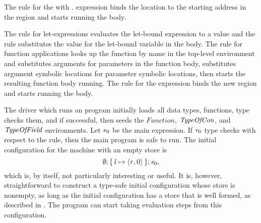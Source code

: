 The \textsc{\dletlocstart{}} rule for the  with .
expression binds the location to the starting address in the region
and starts running the body.

The \textsc{\dletexp{}} rule for let-expressions evaluates the let-bound
expression to a value and the \textsc{\dletval{}} rule substitutes the value for
the let-bound variable in the body.
%
The \textsc{\dapp{}} rule for function applications looks up the function by name
in the top-level environment and substitutes arguments for parameters
in the function body, substitutes argument symbolic locations for
parameter symbolic locations, then starts the resulting function body
running.
%
The \textsc{\dletregion{}} rule for the  expression binds the
new region and starts running the body.
%

The driver which runs an \ourcalc{} program initially loads all data
types, functions, type checks them, and if successful, then seeds the
$Function$, $\mathit{TypeOfCon}$, and $\mathit{TypeOfField}$ environments.
%
Let $\mathit{e}_0$ be the main expression.
%
If $\mathit{e}_0$ type checks with respect to the \textsc{\tprogram{}} rule, then
the main program is safe to run.
%
The initial configuration for the machine with an empty store is
\begin{displaymath}
\emptyset; \{ \, \mathit{l} \mapsto \langle \mathit{r}, 0 \rangle ^{} \,\}; \mathit{e}_0,
\end{displaymath}
which is, by itself, not particularly interesting or useful.
%
It is, however, straightforward to construct a type-safe initial configuration
whose store is nonempty, as long as the initial configuration
has a store that is well formed, as described in .
%
The program can start taking evaluation steps from this configuration.

